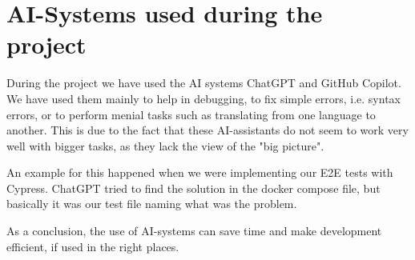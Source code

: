 \section{AI-Systems used during the project}

During the project we have used the AI systems ChatGPT and GitHub Copilot.
We have used them mainly to help in debugging, to fix simple errors, i.e. syntax errors, or to perform menial tasks such as translating from one language to another.
This is due to the fact that these AI-assistants do not seem to work very well with bigger tasks, as they lack the view of the "big picture".

An example for this happened when we were implementing our E2E tests with Cypress. ChatGPT tried to find the solution in the docker compose file, but basically it was our test file naming what was the problem.

As a conclusion, the use of AI-systems can save time and make development efficient, if used in the right places. %
